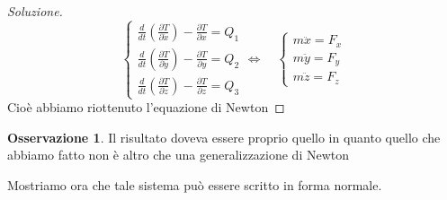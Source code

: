 \documentclass[11pt,a4paper,twoside]{article}
\theoremstyle{definition}
\newtheorem*{oss}{Osservazione}
\newenvironment{sol}
	{\renewcommand\qedsymbol{$\blacksquare$}\begin{proof}[Soluzione]}
	{\end{proof}}
\begin{document}
\begin{sol}
\[\begin{cases}
			\frac d{dt} \left(\frac{\partial T}{\partial \dot x} \right) - \frac{\partial T}{\partial x} = Q_1\\
			\frac d{dt} \left(\frac{\partial T}{\partial \dot y} \right) - \frac{\partial T}{\partial y} = Q_2\\
			\frac d{dt} \left(\frac{\partial T}{\partial \dot z} \right) - \frac{\partial T}{\partial z} = Q_3
		\end{cases} \Leftrightarrow \quad
		\begin{cases}
			m\ddot x = F_x\\
			m\ddot y = F_y\\
			m \ddot z = F_z
		\end{cases}
	\]
	Cioè abbiamo riottenuto l'equazione di Newton
\end{sol}

\begin{oss}
	Il risultato doveva essere proprio quello in quanto quello che abbiamo fatto non è altro che una generalizzazione di Newton
\end{oss}
Mostriamo ora che tale sistema può essere scritto in forma normale.
\end{document}
